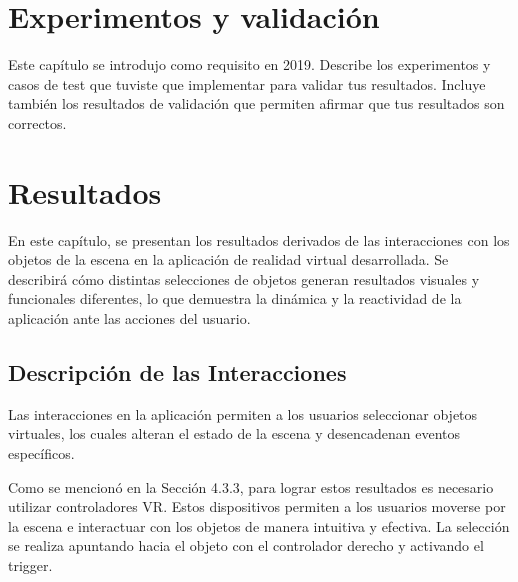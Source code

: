 \documentclass[a4paper, 12pt]{book}
\begin{document}

\cleardoublepage
\chapter{Experimentos y validación}
\label{chap:experimentos}

Este capítulo se introdujo como requisito en 2019. 
Describe los experimentos y casos de test que tuviste que implementar para validar tus resultados. 
Incluye también los resultados de validación que permiten afirmar que tus resultados son correctos. 



\cleardoublepage
\chapter{Resultados}
\label{chap:resultados}

En este capítulo, se presentan los resultados derivados de las interacciones con los objetos de la escena en la aplicación 
de realidad virtual desarrollada. Se describirá cómo distintas selecciones de objetos generan resultados visuales y 
funcionales diferentes, lo que demuestra la dinámica y la reactividad de la aplicación ante las acciones del usuario.

\section{Descripción de las Interacciones}
\label{sec:descripcion_interacciones}
Las interacciones en la aplicación permiten a los usuarios seleccionar objetos virtuales, 
los cuales alteran el estado de la escena y desencadenan eventos específicos. 

Como se mencionó en la Sección 4.3.3, para lograr estos resultados es necesario utilizar controladores VR. 
Estos dispositivos permiten a los usuarios moverse por la escena e interactuar con los objetos de manera intuitiva y efectiva.
La selección se realiza apuntando hacia el objeto con el controlador derecho y activando el trigger.
\end{document}
